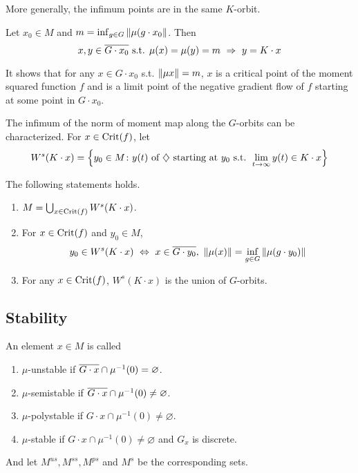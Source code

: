 \documentclass[a4paper,12pt]{article}
\begin{document}
	More generally, the infimum points are in the same $K$-orbit.
	\begin{thm}
		Let $x_0 \in M$ and $m = \inf_{g \in G} \left\lVert\mu(g \cdot x_0\right\lVert$. Then
		\begin{equation*}
			x,y \in  \overline{G \cdot x_0} \text{ s.t. } \mu(x)=\mu(y) =m ~\Rightarrow~ y = K \cdot x
		\end{equation*}
	\end{thm}
	\begin{rem}
		It shows that for any $x \in G \cdot x_0$ s.t. $\left\lVert\mu{x}\right\lVert = m$, $x$ is a critical point of the moment squared function $f$ and is a limit point of the negative gradient flow of $f$ starting at some point in $G \cdot x_0$.
	\end{rem}

	The infimum of the norm of moment map along the $G$-orbits can be characterized. For $x \in \operatorname{Crit}(f)$, let
	\begin{equation*}
		W^s(K \cdot x) = \left\{y_0 \in M \colon y(t) \text{ of }\diamondsuit\text{ starting at }y_0 \text{ s.t. } \lim_{t \rightarrow \infty}y(t) \in K \cdot x\right\}
	\end{equation*}
	\begin{cor} 
		The following statements holds.
		\begin{enumerate}
			\item $M = \bigcup_{x \in \operatorname{Crit}(f)}W^s(K \cdot x)$.
			\item For $x \in \operatorname{Crit}(f)$ and $y_0 \in M$,
			\begin{equation*}
				y_0 \in W^s(K \cdot x) ~\Leftrightarrow~ x \in\overline{G\cdot y_0},~\left\lVert\mu(x)\right\lVert = \inf_{g \in G}\left\lVert\mu(g \cdot y_0)\right\lVert
			\end{equation*}
			\item For any $x \in \operatorname{Crit}(f)$, $W^s(K \cdot x)$ is the union of $G$-orbits.
		\end{enumerate}
	\end{cor}

	
	\subsection{Stability}

	\begin{defn}
		An element $x \in M$ is called
		\begin{enumerate}
			\item $\mu$-unstable if $\overline{G \cdot x} \cap \mu^{-1}(0) = \varnothing$.
			\item $\mu$-semistable if $\overline{G \cdot x} \cap \mu^{-1}(0) \neq \varnothing$.
			\item $\mu$-polystable if ${G \cdot x} \cap \mu^{-1}(0) \neq \varnothing$.
			\item $\mu$-stable if ${G \cdot x} \cap \mu^{-1}(0) \neq \varnothing$ and $G_x$ is discrete.
		\end{enumerate}
		And let $M^{us},M^{ss},M^{ps}$ and $M^{s}$ be the corresponding sets.
	\end{defn}
\end{document}
